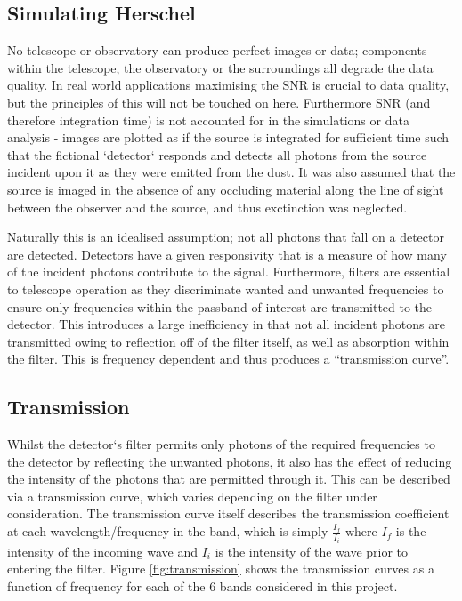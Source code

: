 \documentclass{report}
\begin{document}
\subsection{Simulating Herschel}
No telescope or observatory can produce perfect images or data; components within the telescope, the observatory or the surroundings all degrade the data quality. In real world applications maximising the SNR is crucial to data quality, but the principles of this will not be touched on here. Furthermore SNR (and therefore integration time) is not accounted for in the simulations or data analysis - images are plotted as if the source is integrated for sufficient time such that the fictional `detector` responds and detects all photons from the source incident upon it as they were emitted from the dust. It was also assumed that the source is imaged in the absence of any occluding material along the line of sight between the observer and the source, and thus exctinction was neglected.

Naturally this is an idealised assumption; not all photons that fall on a detector are detected. Detectors have a given responsivity that is a measure of how many of the incident photons contribute to the signal. Furthermore, filters are essential to telescope operation as they discriminate wanted and unwanted frequencies to ensure only frequencies within the passband of interest are transmitted to the detector. This introduces a large inefficiency in that not all incident photons are transmitted owing to reflection off of the filter itself, as well as absorption within the filter. This is frequency dependent and thus produces a ``transmission curve''.

\subsection{Transmission}
Whilst the detector`s filter permits only photons of the required frequencies to the detector by reflecting the unwanted photons, it also has the effect of reducing the intensity of the photons that are permitted through it. This can be described via a transmission curve, which varies depending on the filter under consideration. The transmission curve itself describes the transmission coefficient at each wavelength/frequency in the band, which is simply $\frac{I_{f}}{I_{i}}$ where $I_{f}$ is the intensity of the incoming wave and $I_{i}$ is the intensity of the wave prior to entering the filter. Figure \ref{fig:transmission} shows the transmission curves as a function of frequency for each of the 6 bands considered in this project.
\end{document}
